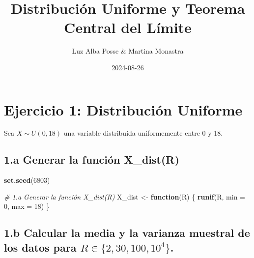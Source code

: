 \documentclass[
]{article}
\title{Distribución Uniforme y Teorema Central del Límite}
\author{Luz Alba Posse \& Martina Monastra}
\date{2024-08-26}
\newenvironment{Shaded}{\begin{snugshade}}{\end{snugshade}}
\newcommand{\AttributeTok}[1]{\textcolor[rgb]{0.13,0.29,0.53}{#1}}
\newcommand{\CommentTok}[1]{\textcolor[rgb]{0.56,0.35,0.01}{\textit{#1}}}
\newcommand{\ControlFlowTok}[1]{\textcolor[rgb]{0.13,0.29,0.53}{\textbf{#1}}}
\newcommand{\DecValTok}[1]{\textcolor[rgb]{0.00,0.00,0.81}{#1}}
\newcommand{\FunctionTok}[1]{\textcolor[rgb]{0.13,0.29,0.53}{\textbf{#1}}}
\newcommand{\NormalTok}[1]{#1}
\newcommand{\OtherTok}[1]{\textcolor[rgb]{0.56,0.35,0.01}{#1}}
\begin{document}
\maketitle

\section{Ejercicio 1: Distribución
Uniforme}\label{ejercicio-1-distribuciuxf3n-uniforme}

Sea \(X \sim U(0, 18)\) una variable distribuida uniformemente entre 0 y
18.

\subsection{1.a Generar la función
X\_dist(R)}\label{a-generar-la-funciuxf3n-x_distr}

\begin{Shaded}
\begin{Highlighting}[]
\FunctionTok{set.seed}\NormalTok{(}\DecValTok{6803}\NormalTok{)}

\CommentTok{\# 1.a Generar la función X\_dist(R)}
\NormalTok{X\_dist }\OtherTok{\textless{}{-}} \ControlFlowTok{function}\NormalTok{(R) \{}
  \FunctionTok{runif}\NormalTok{(R, }\AttributeTok{min =} \DecValTok{0}\NormalTok{, }\AttributeTok{max =} \DecValTok{18}\NormalTok{)}
\NormalTok{\}}
\end{Highlighting}
\end{Shaded}

\subsection{\texorpdfstring{1.b Calcular la media y la varianza muestral
de los datos para
\(R \in \{2, 30, 100, 10^4\}\).}{1.b Calcular la media y la varianza muestral de los datos para R \textbackslash in \textbackslash\{2, 30, 100, 10\^{}4\textbackslash\}.}}\label{b-calcular-la-media-y-la-varianza-muestral-de-los-datos-para-r-in-2-30-100-104.}
\end{document}
